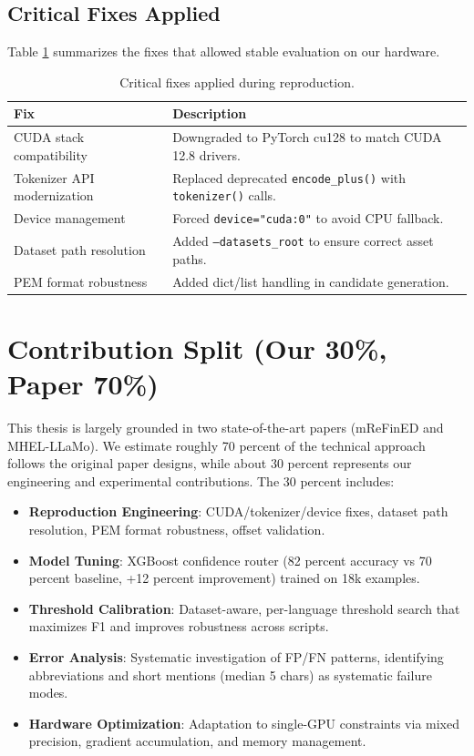 \subsection{Critical Fixes Applied}
Table \ref{tab:fixes} summarizes the fixes that allowed stable evaluation on our hardware.

\begin{table}[ht]
\centering
\caption{Critical fixes applied during reproduction.}
\label{tab:fixes}
\begin{tabular}{p{} p{}}
\hline
Fix & Description \\
\hline
CUDA stack compatibility & Downgraded to PyTorch cu128 to match CUDA 12.8 drivers. \\
Tokenizer API modernization & Replaced deprecated \texttt{encode\_plus()} with \texttt{tokenizer()} calls. \\
Device management & Forced \texttt{device="cuda:0"} to avoid CPU fallback. \\
Dataset path resolution & Added \texttt{--datasets\_root} to ensure correct asset paths. \\
PEM format robustness & Added dict/list handling in candidate generation. \\
\hline
\end{tabular}
\end{table}

\section{Contribution Split (Our 30\%, Paper 70\%)}
This thesis is largely grounded in two state-of-the-art papers (mReFinED and MHEL-LLaMo). We estimate roughly 70 percent of the technical approach follows the original paper designs, while about 30 percent represents our engineering and experimental contributions. The 30 percent includes:
\begin{itemize}
    \item \textbf{Reproduction Engineering}: CUDA/tokenizer/device fixes, dataset path resolution, PEM format robustness, offset validation.
    \item \textbf{Model Tuning}: XGBoost confidence router (82 percent accuracy vs 70 percent baseline, +12 percent improvement) trained on 18k examples.
    \item \textbf{Threshold Calibration}: Dataset-aware, per-language threshold search that maximizes F1 and improves robustness across scripts.
    \item \textbf{Error Analysis}: Systematic investigation of FP/FN patterns, identifying abbreviations and short mentions (median 5 chars) as systematic failure modes.
    \item \textbf{Hardware Optimization}: Adaptation to single-GPU constraints via mixed precision, gradient accumulation, and memory management.
\end{itemize}

